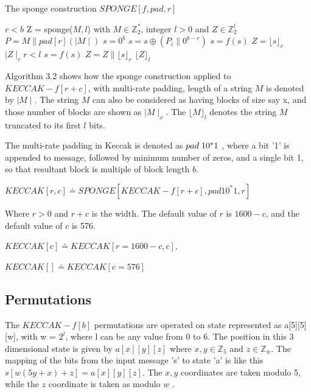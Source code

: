   \begin{algorithm}
    \caption{The sponge construction $SPONGE[f, pad, r]$ \cite{00016}}
    \begin{algorithmic}[1]
      \Require $r < b$
       Z = sponge($M, l$) with $M \in \mathbb{Z}^{*}_{2}$, integer $ l > 0$ and $Z \in \mathbb{Z}^{l}_{2}$
      \State $P = M \parallel pad[r](\mid M \mid)$
      \State $s = 0^{b}$
      \State {}
        \State $s = s \oplus ( P_{i} \parallel 0^{b - r})$
        \State $s = f(s)$
      \State \EndFor
      \State $ Z = \lfloor s \rfloor_{r}$
      \State \While $\mid Z \mid_{r} r < l $
        \State $s = f(s)$
        \State $Z = Z \parallel \lfloor s \rfloor_{r}$
      \State \EndWhile
      \State \Return $\lfloor Z \rfloor_{l}$ 
    \end{algorithmic}
  \end{algorithm}

  Algorithm 3.2 shows how the sponge construction applied to $KECCAK-f[r + c]$, with multi-rate padding, length of a 
  string $M$ is denoted by $\mid M \mid $. The string $M$ can also be considered as having blocks of size say x,
  and those number of blocks are shown as $\mid M \mid_{x}$. The $\lfloor M \rfloor_{l}$ denotes the string
  $M$ truncated to its first $l$ bits.
  
  The multi-rate padding in Keccak is denoted as $pad \thickspace 1 0^{*}1$ , where a bit '1' is appended to message, 
  followed by minimum number of zeros, and a single bit 1, so that resultant block is multiple of block length $b$.
  \begin{center}$KECCAK[r, c] \doteq SPONGE[KECCAK-f[r + c], pad1 0^{*}1, r]$ \end{center}
  Where $ r > 0$ and $r + c$ is the width. The default value of $r$ is $1600 - c$, and the default value of $c$ is 576.
  \begin{center}$KECCAK[c] \doteq KECCAK[r = 1600 - c, c],$\end{center}
  \begin{center}$KECCAK[] \doteq KECCAK[c = 576]$\end{center}
    
  \subsection{Permutations}

  The $KECCAK-f[b]$ permutations are operated on state represented as a[5][5][w], with w = $2^{l}$, where l can be any value
  from 0 to 6. The position in this 3 dimensional state is given by $a[x][y][z]$ where $x, y \in \mathbb{Z}_{5}$ and $z \in 
  \mathbb{Z}_{w}$. The mapping of the bits from the input message 's' to state 'a' is like this $s[w (5y + x) + z] = a[x][y][z]$.
  The $x, y$ coordinates are taken modulo 5, while the $z$ coordinate is taken as modulo $w$ \cite{00015}.

